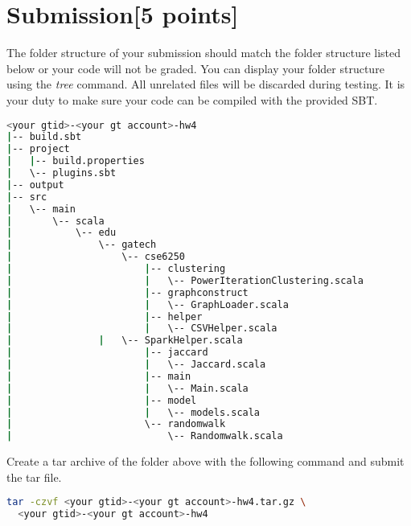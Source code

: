 \documentclass[12pt]{article}
\begin{document}
\section{Submission[5 points]}
The folder structure of your submission should match the folder structure listed below or your code will not be graded. You can display your folder structure using the \textit{tree} command. All  unrelated files will be discarded during testing. It is your duty to make sure your code can be compiled with the provided SBT. 
\begin{lstlisting}[language=bash,frame=single]
<your gtid>-<your gt account>-hw4
|-- build.sbt
|-- project
|   |-- build.properties
|   \-- plugins.sbt
|-- output
|-- src
|   \-- main
|       \-- scala
|           \-- edu
|               \-- gatech
|                   \-- cse6250
|                       |-- clustering
|                       |   \-- PowerIterationClustering.scala
|                       |-- graphconstruct
|                       |   \-- GraphLoader.scala
|                       |-- helper
|                       |   \-- CSVHelper.scala
|		        |   \-- SparkHelper.scala
|                       |-- jaccard
|                       |   \-- Jaccard.scala
|                       |-- main
|                       |   \-- Main.scala
|                       |-- model
|                       |   \-- models.scala
|                       \-- randomwalk
|                           \-- Randomwalk.scala
\end{lstlisting}

Create a tar archive of the folder above with the following command and submit the tar file.
\begin{lstlisting}[language=bash,frame=single]
tar -czvf <your gtid>-<your gt account>-hw4.tar.gz \
  <your gtid>-<your gt account>-hw4
\end{lstlisting}
\end{document}

